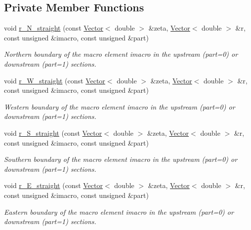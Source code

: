 \subsection*{Private Member Functions}
\begin{DoxyCompactItemize}
\item 
void \hyperlink{classoomph_1_1CollapsibleChannelDomain_aec5509d4e6a229da9fec78ceb78dcb18}{r\+\_\+\+N\+\_\+straight} (const \hyperlink{classoomph_1_1Vector}{Vector}$<$ double $>$ \&zeta, \hyperlink{classoomph_1_1Vector}{Vector}$<$ double $>$ \&r, const unsigned \&imacro, const unsigned \&part)
\begin{DoxyCompactList}\small\item\em Northern boundary of the macro element imacro in the upstream (part=0) or downstream (part=1) sections. \end{DoxyCompactList}\item 
void \hyperlink{classoomph_1_1CollapsibleChannelDomain_a94cebe8b3380c469cfd77924ec57d576}{r\+\_\+\+W\+\_\+straight} (const \hyperlink{classoomph_1_1Vector}{Vector}$<$ double $>$ \&zeta, \hyperlink{classoomph_1_1Vector}{Vector}$<$ double $>$ \&r, const unsigned \&imacro, const unsigned \&part)
\begin{DoxyCompactList}\small\item\em Western boundary of the macro element imacro in the upstream (part=0) or downstream (part=1) sections. \end{DoxyCompactList}\item 
void \hyperlink{classoomph_1_1CollapsibleChannelDomain_a12b9fbd546a2375fea2461a07b5db089}{r\+\_\+\+S\+\_\+straight} (const \hyperlink{classoomph_1_1Vector}{Vector}$<$ double $>$ \&zeta, \hyperlink{classoomph_1_1Vector}{Vector}$<$ double $>$ \&r, const unsigned \&imacro, const unsigned \&part)
\begin{DoxyCompactList}\small\item\em Southern boundary of the macro element imacro in the upstream (part=0) or downstream (part=1) sections. \end{DoxyCompactList}\item 
void \hyperlink{classoomph_1_1CollapsibleChannelDomain_a1f880915f7c2f9163fc1ec8cac676831}{r\+\_\+\+E\+\_\+straight} (const \hyperlink{classoomph_1_1Vector}{Vector}$<$ double $>$ \&zeta, \hyperlink{classoomph_1_1Vector}{Vector}$<$ double $>$ \&r, const unsigned \&imacro, const unsigned \&part)
\begin{DoxyCompactList}\small\item\em Eastern boundary of the macro element imacro in the upstream (part=0) or downstream (part=1) sections. \end{DoxyCompactList}\item 

\end{DoxyCompactItemize}
